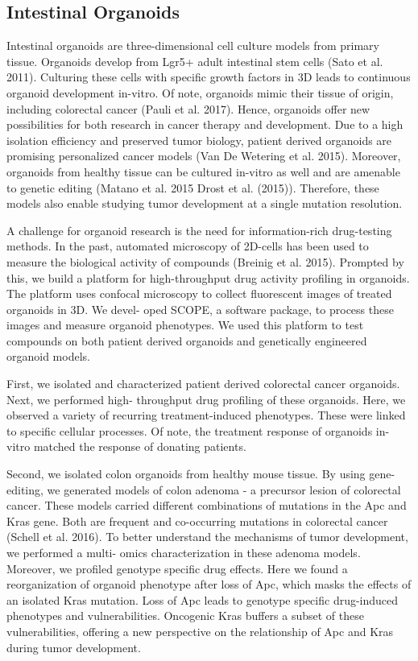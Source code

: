 \begin{flushleft}
\section{Intestinal Organoids}
Intestinal organoids are three-dimensional cell culture models from primary tissue. Organoids develop from Lgr5+ adult intestinal stem cells (Sato et al. 2011). Culturing these cells with specific growth factors in 3D leads to continuous organoid development in-vitro. Of note, organoids mimic their tissue of origin, including colorectal cancer (Pauli et al. 2017). Hence, organoids offer new possibilities for both research in cancer therapy and development. Due to a high isolation efficiency and preserved tumor biology, patient derived organoids are promising personalized cancer models (Van De Wetering et al. 2015). Moreover, organoids from healthy tissue can be cultured in-vitro as well and are amenable to genetic editing (Matano et al. 2015 Drost et al. (2015)). Therefore, these models also enable studying tumor development at a single mutation resolution.

A challenge for organoid research is the need for information-rich drug-testing methods. In the past, automated microscopy of 2D-cells has been used to measure the biological activity of compounds (Breinig et al. 2015). Prompted by this, we build a platform for high-throughput drug activity profiling in organoids. The platform uses confocal microscopy to collect fluorescent images of treated organoids in 3D. We devel- oped SCOPE, a software package, to process these images and measure organoid phenotypes. We used this platform to test compounds on both patient derived organoids and genetically engineered organoid models.

First, we isolated and characterized patient derived colorectal cancer organoids. Next, we performed high- throughput drug profiling of these organoids. Here, we observed a variety of recurring treatment-induced phenotypes. These were linked to specific cellular processes. Of note, the treatment response of organoids in-vitro matched the response of donating patients.

Second, we isolated colon organoids from healthy mouse tissue. By using gene-editing, we generated models of colon adenoma - a precursor lesion of colorectal cancer. These models carried different combinations of mutations in the Apc and Kras gene. Both are frequent and co-occurring mutations in colorectal cancer (Schell et al. 2016). To better understand the mechanisms of tumor development, we performed a multi- omics characterization in these adenoma models. Moreover, we profiled genotype specific drug effects. Here we found a reorganization of organoid phenotype after loss of Apc, which masks the effects of an isolated Kras mutation. Loss of Apc leads to genotype specific drug-induced phenotypes and vulnerabilities. Oncogenic Kras buffers a subset of these vulnerabilities, offering a new perspective on the relationship of Apc and Kras during tumor development.


\end{flushleft}
